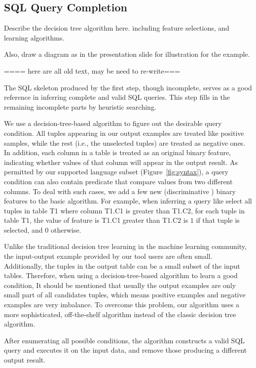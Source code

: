 \subsection{SQL Query Completion}
\label{sec:completion}

Describe the decision tree algorithm here. including feature selections, and learning algorithms.

Also, draw a diagram as in the presentation slide for illustration for the example.


==== here are all old text, may be need to re-write===

The SQL skeleton produced by the first step, though incomplete, serves as a good reference in inferring complete and valid SQL queries. This step fills in the remaining incomplete parts by heuristic searching.

We use a decision-tree-based \cite{Quinlan:1993} algorithm to figure out the
desirable query condition. All tuples appearing in our output examples are
treated like positive samples, while the rest (i.e., the unselected tuples)
are treated as negative ones. In addition, each column in a table is treated
as an original binary feature, indicating whether values of that column will appear in the
output result. As permitted by our supported language subset
(Figure~\ref{fig:syntax}), a query condition can also contain predicate that
 compare values from two different columns. To deal with such cases, we add
a few new (discriminative ) binary features to the basic algorithm. For example,
 when inferring a query like \textsf{select all tuples in table T1 where column
 T1.C1 is greater than T1.C2}, for each tuple in table T1, the value of feature
\textsf{is T1.C1 greater than T1.C2} is $1$ if that tuple is selected,
and $0$ otherwise. 


Unlike the traditional decision tree learning in the machine learning community,
the input-output example provided by our tool users are often small. Additionally,
the tuples in the output table can be a small subset of the input tables.
Therefore, when using a decision-tree-based algorithm to learn a good condition,
It should be mentioned that usually the output examples are only small part of all candidates tuples, which means positive examples and negative examples are very imbalance. 
To overcome this problem, our algorithm uses a more sophisticated, off-the-shelf algorithm\cite{Chris:2003} instead of the classic decision tree algorithm.

 

After enumerating all possible conditions, the algorithm constructs a valid SQL query and executes it on the input data, and remove those producing a different output result.



